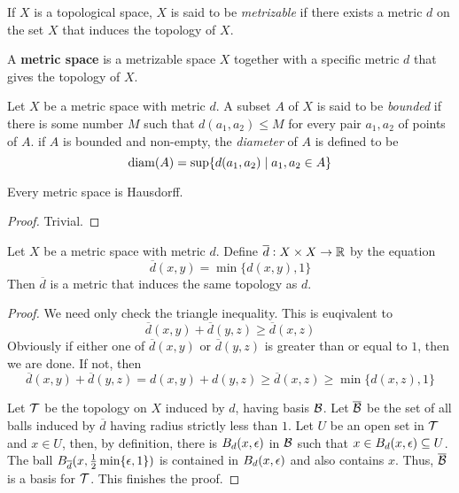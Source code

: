 \begin{definition}[Metrizable]
    If $X$ is a topological space, $X$ is said to be \textit{metrizable} if there exists a metric $d$ on the set $X$ that induces the topology of $X$.
\end{definition}

A \textbf{metric space} is a metrizable space $X$ together with a specific metric $d$ that gives the topology of $X$.

\begin{definition}
    Let $X$ be a metric space with metric $d$. A subset $A$ of $X$ is said to be \textit{bounded} if there is some number $M$ such that $d(a_1,a_2)\le M$ for every pair $a_1,a_2$ of points of $A$. if $A$ is bounded and non-empty, the \textit{diameter} of $A$ is defined to be 
    \begin{equation*}
        \operatorname{diam}(A) = \sup\{d(a_1,a_2)\mid a_1,a_2\in A\}
    \end{equation*}
\end{definition}

\begin{proposition}
    Every metric space is Hausdorff.
\end{proposition}
\begin{proof}
    Trivial.
\end{proof}

\begin{theorem}
    Let $X$ be a metric space with metric $d$. Define $\overline{d}:X\times X\to\mathbb{R}$ by the equation 
    \begin{equation*}
        \overline{d}(x,y) = \min\{d(x,y), 1\}
    \end{equation*}
    Then $\overline{d}$ is a metric that induces the same topology as $d$.
\end{theorem}
\begin{proof}
    We need only check the triangle inequality. This is euqivalent to 
    \begin{equation*}
        \overline{d}(x,y) + \overline{d}(y,z)\ge \overline{d}(x,z)
    \end{equation*}
    Obviously if either one of $\overline{d}(x,y)$ or $\overline{d}(y,z)$ is greater than or equal to $1$, then we are done. If not, then 
    \begin{equation*}
        \overline{d}(x,y) + \overline{d}(y,z) = d(x,y) + d(y,z)\ge\overline{d}(x,z)\ge\min\{d(x,z), 1\}
    \end{equation*}

    Let $\mathcal{T}$ be the topology on $X$ induced by $d$, having basis $\mathcal{B}$. Let $\overline{\mathcal{B}}$ be the set of all balls induced by $\overline{d}$ having radius strictly less than $1$. Let $U$ be an open set in $\mathcal{T}$ and $x\in U$, then, by definition, there is $B_d(x,\epsilon)$ in $\mathcal{B}$ such that $x\in B_d(x,\epsilon)\subseteq U$. The ball $B_{\overline{d}}(x,\frac{1}{2}\min\{\epsilon, 1\})$ is contained in $B_d(x,\epsilon)$ and also contains $x$. Thus, $\overline{\mathcal{B}}$ is a basis for $\mathcal{T}$. This finishes the proof.
\end{proof}

